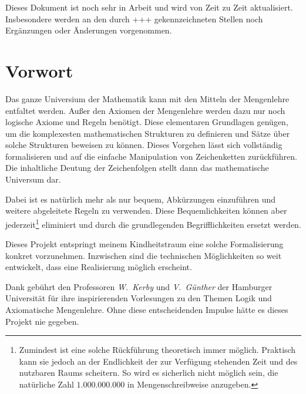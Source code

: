 \documentclass[a4paper,german,10pt,twoside]{book}
\theoremstyle{definition}
\theoremstyle{remark}
\begin{document}
\par
Dieses Dokument ist noch sehr in Arbeit und wird von Zeit zu Zeit aktualisiert. Insbesondere werden
an den durch {\glqq+++\grqq} gekennzeichneten Stellen noch Erg{\"a}nzungen oder {\"A}nderungen vorgenommen.


\chapter*{Vorwort} \label{chapter1} \hypertarget{chapter1}{}

Das ganze Universium der Mathematik kann mit den Mitteln der Mengenlehre
entfaltet werden. Au{\ss}er den Axiomen der Mengenlehre werden dazu nur noch
logische Axiome und Regeln ben{\"o}tigt. Diese elementaren Grundlagen 
gen{\"u}gen, um die komplexesten mathematischen Strukturen zu definieren und
S{\"a}tze {\"u}ber solche Strukturen beweisen zu k{\"o}nnen. Dieses Vorgehen l{\"a}sst 
sich vollst{\"a}ndig formalisieren und auf die einfache Manipulation von 
Zeichenketten zur{\"u}ckf{\"u}hren. Die inhaltliche Deutung der Zeichenfolgen 
stellt dann das mathematische Universum dar.

\par
Dabei ist es nat{\"u}rlich mehr als nur bequem, Abk{\"u}rzungen einzuf{\"u}hren und 
weitere abgeleitete Regeln zu verwenden. Diese Bequemlichkeiten k{\"o}nnen 
aber jederzeit\footnote{Zumindest ist eine solche R{\"u}ckf{\"u}hrung theoretisch 
immer m{\"o}glich. Praktisch kann sie jedoch an der Endlichkeit der zur
Verf{\"u}gung stehenden Zeit und des nutzbaren Raums scheitern. So wird es 
sicherlich nicht m{\"o}glich sein, die nat{\"u}rliche Zahl $1.000.000.000$ in 
Mengenschreibweise anzugeben.} eliminiert und durch die grundlegenden 
Begrifflichkeiten ersetzt werden.

\par
Dieses Projekt entspringt meinem Kindheitstraum eine solche 
Formalisierung konkret vorzunehmen. Inzwischen sind die technischen 
M{\"o}glichkeiten so weit entwickelt, dass eine Realisierung m{\"o}glich 
erscheint.

\par
Dank geb{\"u}hrt den Professoren \emph{W.~Kerby} und \emph{V.~G{\"u}nther} der 
Hamburger Universit{\"a}t f{\"u}r ihre inspirierenden Vorlesungen zu den Themen 
Logik und Axiomatische Mengenlehre. Ohne diese entscheidenden Impulse 
h{\"a}tte es dieses Projekt nie gegeben.
\end{document}
